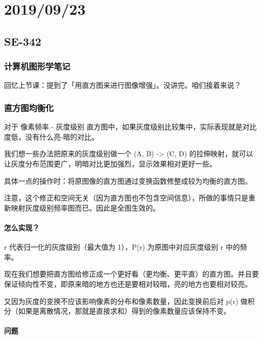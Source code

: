 \documentclass[
]{article}
\date{}
\begin{document}
\hypertarget{header-n0}{%
\section{2019/09/23}\label{header-n0}}

\hypertarget{header-n2}{%
\subsection{SE-342}\label{header-n2}}

\hypertarget{header-n3}{%
\subsubsection{计算机图形学笔记}\label{header-n3}}

回忆上节课：提到了「用直方图来进行图像增强」。没讲完。咱们接着来说？

\hypertarget{header-n5}{%
\subsubsection{直方图均衡化}\label{header-n5}}

对于 像素频率 - 灰度级别
直方图中，如果灰度级别比较集中，实际表现就是对比度低，没有什么亮-暗的对比。

我们想一些办法把原来的灰度级别做一个 (A, B) -\textgreater{} (C, D)
的拉伸映射，就可以让灰度分布范围更广，明暗对比更加强烈，显示效果相对更好一些。

具体一点的操作时：将原图像的直方图通过变换函数修整成较为均衡的直方图。

注意，这个修正和空间无关（因为直方图也不包含空间信息），所做的事情只是重新映射灰度级别频率图而已。因此是全图生效的。

\hypertarget{header-n10}{%
\paragraph{怎么实现？}\label{header-n10}}

r 代表归一化的灰度级别（最大值为 1），P(r) 为原图中对应灰度级别 r
中的频率。

现在我们想要把直方图给修正成一个更好看（更均衡、更平直）的直方图。并且要保证倾向性不变，即原来暗的地方也还是要相对较暗，亮的地方也要相对较亮。

又因为灰度的变换不应该影响像素的分布和像素数量，因此变换前后对 p(r)
做积分（如果是离散情况，那就是直接求和）得到的像素数量应该保持不变。

\hypertarget{header-n14}{%
\paragraph{问题}\label{header-n14}}
\end{document}
